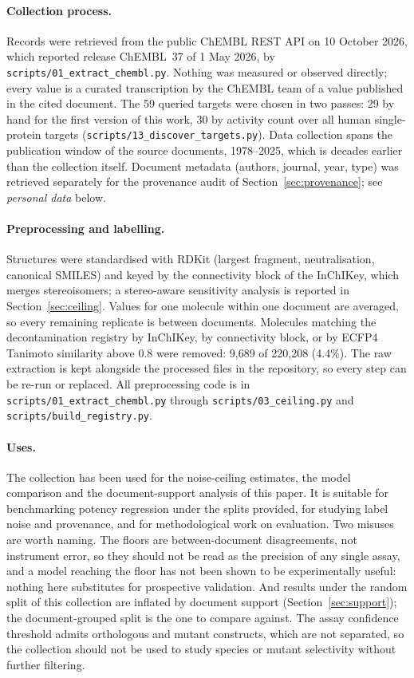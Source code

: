 \paragraph{Collection process.} Records were retrieved from the public ChEMBL REST API on 10 October 2026, which reported release ChEMBL~37 of 1 May 2026, by \texttt{scripts/01\_extract\_chembl.py}. Nothing was measured or observed directly; every value is a curated transcription by the ChEMBL team of a value published in the cited document. The 59 queried targets were chosen in two passes: 29 by hand for the first version of this work, 30 by activity count over all human single-protein targets (\texttt{scripts/13\_discover\_targets.py}). Data collection spans the publication window of the source documents, 1978--2025, which is decades earlier than the collection itself. Document metadata (authors, journal, year, type) was retrieved separately for the provenance audit of Section~\ref{sec:provenance}; see \emph{personal data} below.

\paragraph{Preprocessing and labelling.} Structures were standardised with RDKit (largest fragment, neutralisation, canonical SMILES) and keyed by the connectivity block of the InChIKey, which merges stereoisomers; a stereo-aware sensitivity analysis is reported in Section~\ref{sec:ceiling}. Values for one molecule within one document are averaged, so every remaining replicate is between documents. Molecules matching the decontamination registry by InChIKey, by connectivity block, or by ECFP4 Tanimoto similarity above 0.8 were removed: 9{,}689 of 220{,}208 (4.4\%). The raw extraction is kept alongside the processed files in the repository, so every step can be re-run or replaced. All preprocessing code is in \texttt{scripts/01\_extract\_chembl.py} through \texttt{scripts/03\_ceiling.py} and \texttt{scripts/build\_registry.py}.

\paragraph{Uses.} The collection has been used for the noise-ceiling estimates, the model comparison and the document-support analysis of this paper. It is suitable for benchmarking potency regression under the splits provided, for studying label noise and provenance, and for methodological work on evaluation. Two misuses are worth naming. The floors are between-document disagreements, not instrument error, so they should not be read as the precision of any single assay, and a model reaching the floor has not been shown to be experimentally useful: nothing here substitutes for prospective validation. And results under the random split of this collection are inflated by document support (Section~\ref{sec:support}); the document-grouped split is the one to compare against. The assay confidence threshold admits orthologous and mutant constructs, which are not separated, so the collection should not be used to study species or mutant selectivity without further filtering.

